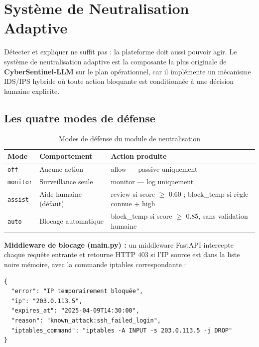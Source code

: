 \documentclass[12pt,a4paper]{report}
\begin{document}
\section{Système de Neutralisation Adaptive}
\begin{onehalfspace}
Détecter et expliquer ne suffit pas : la plateforme doit aussi pouvoir
agir. Le système de neutralisation adaptive est la composante la plus
originale de \textbf{CyberSentinel-LLM} sur le plan opérationnel, car il
implémente un mécanisme IDS/IPS hybride où toute action bloquante est
conditionnée à une décision humaine explicite.

\subsection*{Les quatre modes de défense}
\end{onehalfspace}

\begin{table}[H]
\centering
\caption{Modes de défense du module de neutralisation}
\label{tab:defense_modes}
\begin{tabular}{|p{2.5cm}|p{4cm}|p{7cm}|}
\hline
\textbf{Mode} & \textbf{Comportement} & \textbf{Action produite} \\
\hline
\texttt{off} & Aucune action & allow — passive uniquement \\
\hline
\texttt{monitor} & Surveillance seule & monitor — log uniquement \\
\hline
\texttt{assist} & Aide humaine (défaut) & review si score $\geq$ 0.60 ;
block\_temp si règle connue + high \\
\hline
\texttt{auto} & Blocage automatique & block\_temp si score $\geq$ 0.85,
sans validation humaine \\
\hline
\end{tabular}
\end{table}

\begin{onehalfspace}
\textbf{Middleware de blocage (main.py) :} un middleware FastAPI intercepte
chaque requête entrante et retourne HTTP 403 si l'IP source est dans la liste
noire mémoire, avec la commande iptables correspondante :
\end{onehalfspace}

\begin{tcolorbox}[colback=lightblue, colframe=darkblue, arc=5pt,
  title={\textbf{Réponse HTTP 403 — IP bloquée}}]
\begin{small}
\begin{verbatim}
{
  "error": "IP temporairement bloquée",
  "ip": "203.0.113.5",
  "expires_at": "2025-04-09T14:30:00",
  "reason": "known_attack:ssh_failed_login",
  "iptables_command": "iptables -A INPUT -s 203.0.113.5 -j DROP"
}
\end{verbatim}
\end{small}
\end{tcolorbox}
\end{document}
